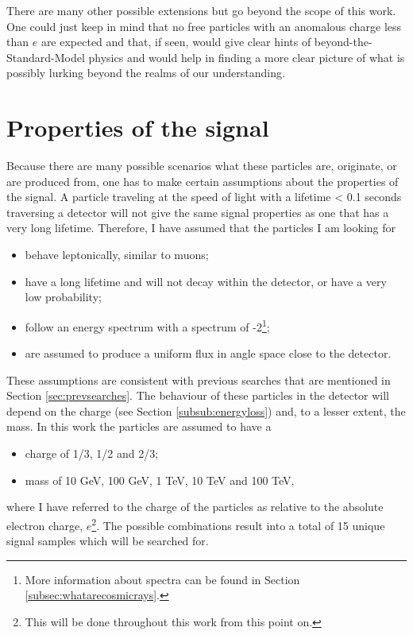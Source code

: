 There are many other possible extensions but go beyond the scope of this work. One could just keep in mind that no free particles with an anomalous charge less than $e$ are expected and that, if seen, would give clear hints of beyond-the-Standard-Model physics and would help in finding a more clear picture of what is possibly lurking beyond the realms of our understanding.



\section{Properties of the signal}
Because there are many possible scenarios what these particles are, originate, or are produced from, one has to make certain assumptions about the properties of the signal. A particle traveling at the speed of light with a lifetime < 0.1 seconds traversing a detector will not give the same signal properties as one that has a very long lifetime. Therefore, I have assumed that the particles I am looking for

\begin{itemize}
\item behave leptonically, similar to muons;
\item have a long lifetime and will not decay within the detector, or have a very low probability;
\item follow an energy spectrum with a spectrum of -2\footnote{More information about spectra can be found in Section \ref{subsec:whatarecosmicrays}.};
\item are assumed to produce a uniform flux in angle space close to the detector.
\end{itemize}
These assumptions are consistent with previous searches that are mentioned in Section \ref{sec:prevsearches}. The behaviour of these particles in the detector will depend on the charge (see Section \ref{subsub:energyloss}) and, to a lesser extent, the mass. In this work the particles are assumed to have a

\begin{itemize}
\item charge of 1/3, 1/2 and 2/3;
\item mass of 10 GeV, 100 GeV, 1 TeV, 10 TeV and 100 TeV,
\end{itemize}

\noindent where I have referred to the charge of the particles as relative to the absolute electron charge, $e$\footnote{This will be done throughout this work from this point on.}. The possible combinations result into a total of 15 unique signal samples which will be searched for.

